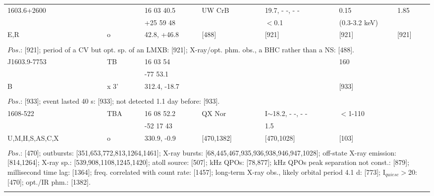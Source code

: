 \documentclass{aa}
\begin{document}
\begin{tabular}{p{2.5cm}p{1cm}p{1.8cm}p{2.3cm}p{3.3cm}p{2.0cm}p{2.2cm}}
\noalign{\smallskip}
1603.6+2600      &            & 16 03 40.5     & UW CrB       & 19.7, - -, - -          & 0.15                   & 1.85      \\
                             &             & +25 59 48     &                        & $<$0.1                & (0.3-3.2 keV)    &               \\
E,R                      & o          & 42.8, +46.8   & [488]              & [921]                   & [921]                  & [921]     \\
\\
\multicolumn{7}{p{17.5cm}}{
$Pos$.: [921]; period of a CV but opt. sp. of an LMXB: [921]; X-ray/opt. phm. obs., a BHC rather than a NS: [488].}\\
\noalign{\smallskip}
\hline

\noalign{\smallskip}
J1603.9-7753  & TB    & 16 03 54           &                      &                        & 160              &          \\
                           &          &  -77 53.1           &                      &                        &                       &               \\
B                        & x 3'   & 312.4, -18.7       &                       &                        & [933]            &        \\
\\
\multicolumn{7}{p{17.5cm}}{
$Pos$.: [933]; event lasted 40 s: [933]; not detected 1.1 day before: [933].}\\
\noalign{\smallskip}
\hline

\noalign{\smallskip}
1608-522                & TBA   & 16 08 52.2   & QX Nor           & I$\sim$18.2, - -, - -    & $<$1-110  &          \\
                                 &             & -52 17 43     &                          & 1.5                               &                    &    \\
U,M,H,S,AS,C,X   & o          & 330.9, -0.9   & [470,1382]      & [470,1028]                 & [103]            &         \\
\\
\multicolumn{7}{p{17.5cm}}{
$Pos$.: [470]; outbursts: [351,653,772,813,1264,1461]; X-ray bursts: [68,445,467,935,936,938,946,947,1028]; 
off-state X-ray emission: [814,1264]; X-ray sp.: [539,908,1108,1245,1420]; atoll source: [507]; kHz QPOs: [78,877]; 
kHz QPOs peak separation not const.: [879]; millisecond time lag: [1364]; freq. correlated with count rate: [1457]; 
long-term X-ray obs., likely orbital period 4.1 d: [773]; I$_{quiesc}>$20: [470]; opt./IR phm.: [1382].}\\
\noalign{\smallskip}
\hline


\end{tabular}
\end{document}
